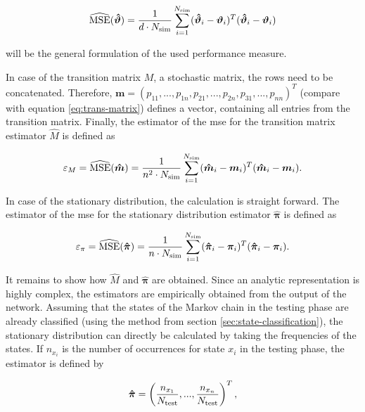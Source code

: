 \begin{equation}
\label{eq:mse-est}
\widehat{\text{MSE}}(\bm{\hat\vartheta}) = \frac{1}{d \cdot N_{\text{sim}}} \sum_{i=1}^{N_{\text{sim}}} (\bm{\hat\vartheta}_i - \bm\vartheta_i)^T (\bm{\hat\vartheta}_i - \bm\vartheta_i)
\end{equation}

will be the general formulation of the used performance measure.

In case of the transition matrix $M$, a stochastic matrix, the rows need to be concatenated. Therefore, $\bm m = (p_{11}, ..., p_{1n}, p_{21}, ..., p_{2n}, p_{31}, ..., p_{nn})^T$ (compare with equation \eqref{eq:trans-matrix}) defines a vector, containing all entries from the transition matrix. Finally, the estimator of the \ac{mse} for the transition matrix estimator $\hat M$ is defined as

\begin{equation}
\varepsilon_M = \widehat{\text{MSE}}(\bm{\hat m}) = \frac{1}{n^2 \cdot N_{\text{sim}}} \sum_{i=1}^{N_{\text{sim}}} (\bm{\hat m}_i - \bm m_i)^T (\bm{\hat m}_i - \bm m_i).
\end{equation}


In case of the stationary distribution, the calculation is straight forward. The estimator of the \ac{mse} for the stationary distribution estimator $\bm{\hat\pi}$ is defined as

\begin{equation}
\varepsilon_\pi = \widehat{\text{MSE}}(\bm{\hat\pi}) = \frac{1}{n \cdot N_{\text{sim}}} \sum_{i=1}^{N_{\text{sim}}} (\bm{\hat\pi}_i - \bm\pi_i)^T (\bm{\hat\pi}_i - \bm\pi_i).
\end{equation}


It remains to show how $\hat M$ and $\bm{\hat\pi}$ are obtained. Since an analytic representation is highly complex, the estimators are empirically obtained from the output of the network. Assuming that the states of the Markov chain in the testing phase are already classified (using the method from section \ref{sec:state-classification}), the stationary distribution can directly be calculated by taking the frequencies of the states. If $n_{x_i}$ is the number of occurrences for state $x_i$ in the testing phase, the estimator is defined by

\begin{equation}
\bm{\hat\pi} = \left( \frac{n_{x_1}}{N_{\text{test}}}, ..., \frac{n_{x_n}}{N_{\text{test}}} \right)^T,
\end{equation}

